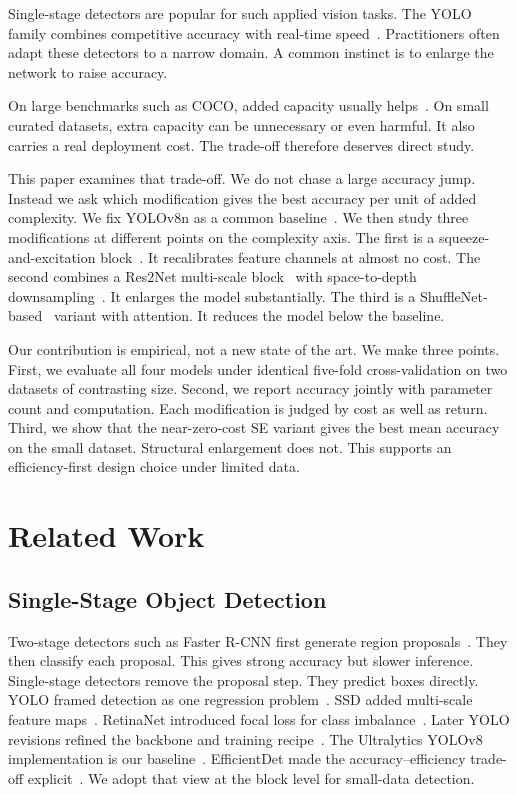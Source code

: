 \documentclass[conference,a4paper]{IEEEtran}
\begin{document}
Single-stage detectors are popular for such applied vision tasks. The YOLO
family combines competitive accuracy with real-time speed~\cite{redmon2016you,
bochkovskiy2020yolov4, jocher2023yolov8}. Practitioners often adapt these
detectors to a narrow domain. A common instinct is to enlarge the network to
raise accuracy.

On large benchmarks such as COCO, added capacity usually
helps~\cite{lin2014microsoft}. On small curated datasets, extra capacity can
be unnecessary or even harmful. It also carries a real deployment cost. The
trade-off therefore deserves direct study.

This paper examines that trade-off. We do not chase a large accuracy jump.
Instead we ask which modification gives the best accuracy per unit of added
complexity. We fix YOLOv8n as a common baseline~\cite{jocher2023yolov8}. We
then study three modifications at different points on the complexity axis.
The first is a squeeze-and-excitation block~\cite{hu2018squeeze}. It
recalibrates feature channels at almost no cost. The second combines a
Res2Net multi-scale block~\cite{gao2021res2net} with space-to-depth
downsampling~\cite{sunkara2022no}. It enlarges the model substantially. The
third is a ShuffleNet-based~\cite{ma2018shufflenet} variant with attention.
It reduces the model below the baseline.

Our contribution is empirical, not a new state of the art. We make three
points. First, we evaluate all four models under identical five-fold
cross-validation on two datasets of contrasting size. Second, we report
accuracy jointly with parameter count and computation. Each modification is
judged by cost as well as return. Third, we show that the near-zero-cost SE
variant gives the best mean accuracy on the small dataset. Structural
enlargement does not. This supports an efficiency-first design choice under
limited data.

\section{Related Work}

\subsection{Single-Stage Object Detection}
Two-stage detectors such as Faster R-CNN first generate region
proposals~\cite{ren2015faster}. They then classify each proposal. This gives
strong accuracy but slower inference. Single-stage detectors remove the
proposal step. They predict boxes directly. YOLO framed detection as one
regression problem~\cite{redmon2016you}. SSD added multi-scale feature
maps~\cite{liu2016ssd}. RetinaNet introduced focal loss for class
imbalance~\cite{lin2017focal}. Later YOLO revisions refined the backbone and
training recipe~\cite{redmon2018yolov3, bochkovskiy2020yolov4}. The
Ultralytics YOLOv8 implementation is our baseline~\cite{jocher2023yolov8}.
EfficientDet made the accuracy--efficiency trade-off
explicit~\cite{tan2020efficientdet}. We adopt that view at the block level for
small-data detection.
\end{document}
